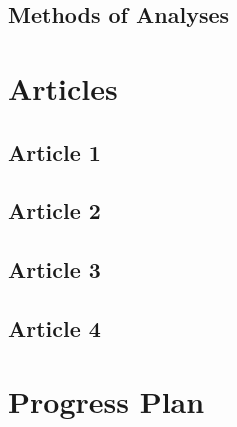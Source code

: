 \documentclass[
    a4paper,                %
    11pt,                   %
    stu,                    %
    donotrepeattitle,       %
    floatsintext,           %
    biblatex,               %
    colorlinks=true,        %
    linkcolor=red,          %
    anchorcolor=black,      %
    citecolor=blue,         %
    urlcolor=blue,          %
    bookmarks=true,         %
    bookmarksopen=false,    %
    bookmarksnumbered=true, %
    dvipsnames              %
]{apa7}
\begin{document}
\subsection{Methods of Analyses}

\section{Articles}

\subsection{Article 1}

\subsection{Article 2}

\subsection{Article 3}

\subsection{Article 4}

\section{Progress Plan}
\end{document}
